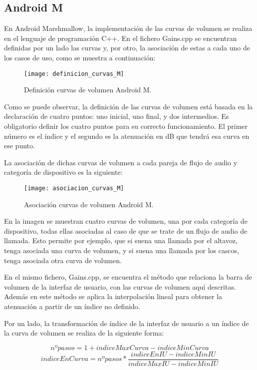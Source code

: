 \subsection{Android M}
En Android Marshmallow, la implementación de las curvas de volumen se realiza en el lenguaje de programación C++. En el fichero Gains.cpp se encuentran definidas por un lado las curvas y, por otro, la asociación de estas a cada uno de los casos de uso, como se muestra a continuación:

\begin{figure}[H]
		\centering
		\texttt{[image: definicion\_curvas\_M]}
		\caption{Definición curvas de volumen Android M.}
		\label{fig:declaracion_curvas_M}
\end{figure}

Como se puede observar, la definición de las curvas de volumen está basada en la declaración de cuatro puntos: uno inicial, uno final, y dos intermedios. Es obligatorio definir los cuatro puntos para su correcto funcionamiento. El primer número es el índice y el segundo es la atenuación en \gls{dB} que tendrá esa curva en ese punto.

La asociación de dichas curvas de volumen a cada pareja de flujo de audio y categoría de dispositivo es la siguiente:

\begin{figure}[H]
	\centering
	\texttt{[image: asociacion\_curvas\_M]}
	\caption{Asociación curvas de volumen Android M.}
	\label{fig:asociacion_curvas_M}
\end{figure}

En la imagen se muestran cuatro curvas de volumen, una por cada categoría de dispositivo, todas ellas asociadas al caso de que se trate de un flujo de audio de llamada. Esto permite por ejemplo, que si suena una llamada por el altavoz, tenga asociada una curva de volumen, y si suena una llamada por los cascos, tenga asociada otra curva de volumen.

En el mismo fichero, Gains.cpp, se encuentra el método que relaciona la barra de volumen de la interfaz de usuario, con las curvas de volumen aquí descritas. Además en este método se aplica la interpolación lineal para obtener la atenuación a partir de un índice no definido.

Por un lado, la transformación de índice de la interfaz de usuario a un índice de la curva de volumen se realiza de la siguiente forma:

\begin{equation}
	nº pasos=1+indiceMaxCurva - indiceMinCurva
\end{equation}
\begin{equation}\label{ec:indiceEnCurva}
	indiceEnCurva= nºpasos*\frac{indiceEnIU - indiceMinIU
	}{indiceMaxIU-indiceMinIU}
\end{equation}

